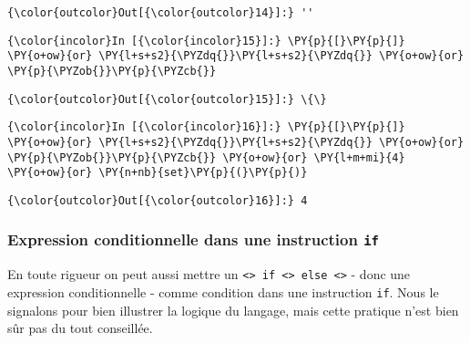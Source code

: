 \begin{Verbatim}[commandchars=\\\{\},frame=single,framerule=0.3mm,rulecolor=\color{cellframecolor}]
{\color{outcolor}Out[{\color{outcolor}14}]:} ''
\end{Verbatim}
            
    \begin{Verbatim}[commandchars=\\\{\},frame=single,framerule=0.3mm,rulecolor=\color{cellframecolor}]
{\color{incolor}In [{\color{incolor}15}]:} \PY{p}{[}\PY{p}{]} \PY{o+ow}{or} \PY{l+s+s2}{\PYZdq{}}\PY{l+s+s2}{\PYZdq{}} \PY{o+ow}{or} \PY{p}{\PYZob{}}\PY{p}{\PYZcb{}}
\end{Verbatim}


\begin{Verbatim}[commandchars=\\\{\},frame=single,framerule=0.3mm,rulecolor=\color{cellframecolor}]
{\color{outcolor}Out[{\color{outcolor}15}]:} \{\}
\end{Verbatim}
            
    \begin{Verbatim}[commandchars=\\\{\},frame=single,framerule=0.3mm,rulecolor=\color{cellframecolor}]
{\color{incolor}In [{\color{incolor}16}]:} \PY{p}{[}\PY{p}{]} \PY{o+ow}{or} \PY{l+s+s2}{\PYZdq{}}\PY{l+s+s2}{\PYZdq{}} \PY{o+ow}{or} \PY{p}{\PYZob{}}\PY{p}{\PYZcb{}} \PY{o+ow}{or} \PY{l+m+mi}{4} \PY{o+ow}{or} \PY{n+nb}{set}\PY{p}{(}\PY{p}{)}
\end{Verbatim}


\begin{Verbatim}[commandchars=\\\{\},frame=single,framerule=0.3mm,rulecolor=\color{cellframecolor}]
{\color{outcolor}Out[{\color{outcolor}16}]:} 4
\end{Verbatim}
            
    \hypertarget{expression-conditionnelle-dans-une-instruction-if}{%
\subsubsection{\texorpdfstring{Expression conditionnelle dans une
instruction
\texttt{if}}{Expression conditionnelle dans une instruction if}}\label{expression-conditionnelle-dans-une-instruction-if}}

    En toute rigueur on peut aussi mettre un
\texttt{\textless{}\textgreater{}\ if\ \textless{}\textgreater{}\ else\ \textless{}\textgreater{}}
- donc une expression conditionnelle - comme condition dans une
instruction \texttt{if}. Nous le signalons pour bien illustrer la
logique du langage, mais cette pratique n'est bien sûr pas du tout
conseillée.

